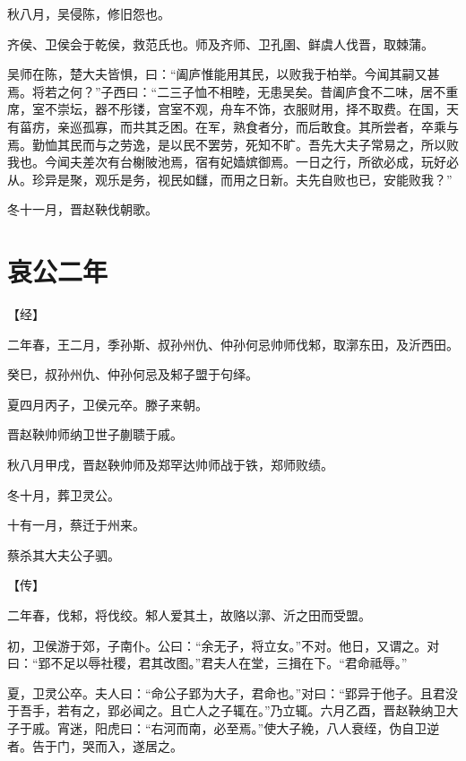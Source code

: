 \documentclass[a4paper,12pt,UTF8,twoside]{ctexbook}
\begin{document}
秋八月，吴侵陈，修旧怨也。

齐侯、卫侯会于乾侯，救范氏也。师及齐师、卫孔圉、鲜虞人伐晋，取棘蒲。

吴师在陈，楚大夫皆惧，曰：“阖庐惟能用其民，以败我于柏举。今闻其嗣又甚焉。将若之何？”子西曰：“二三子恤不相睦，无患吴矣。昔阖庐食不二味，居不重席，室不崇坛，器不彤镂，宫室不观，舟车不饰，衣服财用，择不取费。在国，天有菑疠，亲巡孤寡，而共其乏困。在军，熟食者分，而后敢食。其所尝者，卒乘与焉。勤恤其民而与之劳逸，是以民不罢劳，死知不旷。吾先大夫子常易之，所以败我也。今闻夫差次有台榭陂池焉，宿有妃嫱嫔御焉。一日之行，所欲必成，玩好必从。珍异是聚，观乐是务，视民如讎，而用之日新。夫先自败也已，安能败我？”

冬十一月，晋赵鞅伐朝歌。


\section{哀公二年}



【经】

二年春，王二月，季孙斯、叔孙州仇、仲孙何忌帅师伐邾，取漷东田，及沂西田。

癸巳，叔孙州仇、仲孙何忌及邾子盟于句绎。

夏四月丙子，卫侯元卒。滕子来朝。

晋赵鞅帅师纳卫世子蒯聩于戚。

秋八月甲戌，晋赵鞅帅师及郑罕达帅师战于铁，郑师败绩。

冬十月，葬卫灵公。

十有一月，蔡迁于州来。

蔡杀其大夫公子驷。

【传】

二年春，伐邾，将伐绞。邾人爱其土，故赂以漷、沂之田而受盟。

初，卫侯游于郊，子南仆。公曰：“余无子，将立女。”不对。他日，又谓之。对曰：“郢不足以辱社稷，君其改图。”君夫人在堂，三揖在下。“君命祗辱。”

夏，卫灵公卒。夫人曰：“命公子郢为大子，君命也。”对曰：“郢异于他子。且君没于吾手，若有之，郢必闻之。且亡人之子辄在。”乃立辄。六月乙酉，晋赵鞅纳卫大子于戚。宵迷，阳虎曰：“右河而南，必至焉。”使大子絻，八人衰绖，伪自卫逆者。告于门，哭而入，遂居之。
\end{document}
